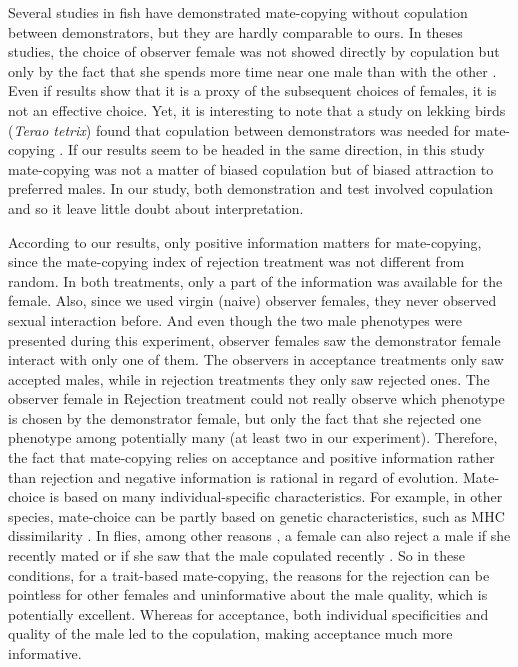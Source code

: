 \documentclass[a4paper, 12pt]{article}
\begin{document}
Several studies in fish have demonstrated mate-copying without copulation between demonstrators, but they are hardly comparable to ours.
In theses studies, the choice of observer female was not showed directly by copulation but only by the fact that she spends more time near one male than with the other \parencite{dugatkin_reversal_1992,galef_mate-choice_1998}. Even if \textcite{bischoff_tail_1985} results show that it is a proxy of the subsequent choices of females, it is not an effective choice.
Yet, it is interesting to note that a study on lekking birds (\textit{Terao tetrix}) found that copulation between demonstrators was needed for mate-copying \parencite{hoglund_mate_1995}. If our results seem to be headed in the same direction, in this study mate-copying was not a matter of biased copulation but of biased attraction to preferred males. In our study, both demonstration and test involved copulation and so it leave little doubt about interpretation.

According to our results, only positive information matters for mate-copying, since the mate-copying index of rejection treatment was not different from random.
In both treatments, only a part of the information was available for the female.
Also, since we used virgin (naive) observer females, they never observed sexual interaction before.
And even though the two male phenotypes were presented during this experiment, observer females saw the demonstrator female interact with only one of them.
The observers in acceptance treatments only saw accepted males, while in rejection treatments they only saw rejected ones.
The observer female in Rejection treatment could not really observe which phenotype is chosen by the demonstrator female, but only the fact that she rejected one phenotype among potentially many (at least two in our experiment).
Therefore, the fact that mate-copying relies on acceptance and positive information rather than rejection and negative information is rational in regard of evolution.
Mate-choice is based on many individual-specific characteristics. For example, in other species, mate-choice can be partly based on genetic characteristics, such as MHC dissimilarity \parencite{wedekind_mhc_1995, landry_good_2001}. In flies, among other reasons \parencite{tennant_causes_2014}, a female can also reject a male if she recently mated \parencite{chapman_sex_2003} or if she saw that the male copulated recently \parencite{loyau_when_2012}.
So in these conditions, for a trait-based mate-copying, the reasons for the rejection can be pointless for other females and uninformative about the male quality, which is potentially excellent.
Whereas for acceptance, both individual specificities and quality of the male led to the copulation, making acceptance much more informative.
\end{document}
